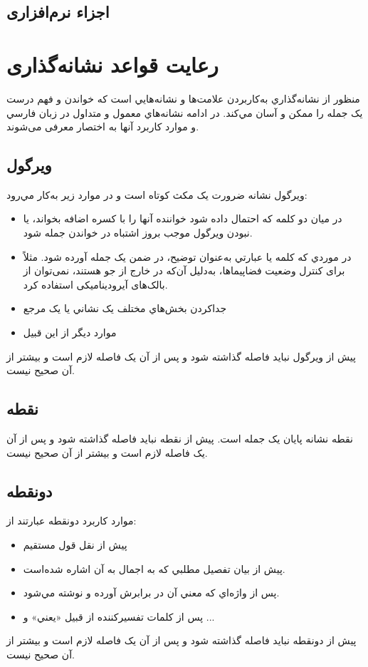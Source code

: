 \subsection{اجزاء نرم‌افزاری}

\section{رعایت قواعد نشانه‌گذاری}
منظور از نشانه‌گذاري به‌کار‌بردن علامت‌ها و نشانه‌هايي است که خواندن و فهم درست یک جمله را ممکن و آسان مي‌کند. در ادامه نشانه‌هاي معمول و متداول در زبان فارسي و موارد کاربرد آنها به اختصار معرفی می‌شوند.

\subsection{ويرگول}
ويرگول نشانه ضرورت یک مکث کوتاه است و در موارد زير به‌کار مي‌رود:
\begin{itemize}
\item
در ميان دو کلمه که احتمال داده شود خواننده آنها را با کسره اضافه بخواند، يا نبودن ويرگول موجب بروز اشتباه در خواندن جمله شود.
\item
در موردي که کلمه يا عبارتي به‌‌‌‌عنوان توضيح، در ضمن یک جمله آورده شود. مثلاً برای کنترل وضعیت فضاپیماها، به‌دلیل آن‌که در خارج از جو هستند، نمی‌توان از بالک‌های آیرودینامیکی استفاده کرد.
\item
جدا‌کردن بخش‌هاي مختلف يک نشاني يا یک مرجع
\item
موارد دیگر از این قبیل
\end{itemize}
پیش از ويرگول نبايد فاصله گذاشته شود و پس از آن يک فاصله لازم است و بيشتر از آن صحیح نیست.
\subsection{نقطه}
نقطه نشانه پایان یک جمله است. پیش از نقطه نبايد فاصله گذاشته شود و پس از آن يک فاصله لازم است و بيشتر از آن صحیح نیست.
\subsection{دونقطه}
موارد کاربرد دونقطه عبارتند از:
\begin{itemize}
\item
پيش از نقل قول مستقيم
\item
پيش از بيان تفصيل مطلبي که به اجمال به آن اشاره شده‌است.
\item
پس از واژه‌اي که معني آن در برابرش آورده و نوشته مي‌شود.
\item
پس از کلمات تفسير‌کننده از قبيل «يعني» و ...
\end{itemize}
پیش از دونقطه نبايد فاصله گذاشته شود و پس از آن يک فاصله لازم است و بيشتر از آن صحیح نیست.
